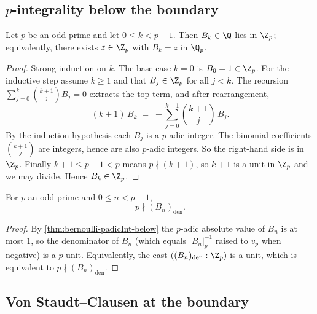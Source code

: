 \subsection*{$p$-integrality below the boundary}

\begin{theorem}
  \label{thm:bernoulli-padicInt-below}
  \leanok
Let $p$ be an odd prime and let $0 \le k < p - 1$. Then
$B_k \in \Q$ lies in $\Z_p$; equivalently, there exists $z \in \Z_p$
with $B_k = z$ in $\Q_p$.
\end{theorem}

\begin{proof}\leanok
Strong induction on $k$. The base case $k = 0$ is $B_0 = 1 \in \Z_p$.
For the inductive step assume $k \ge 1$ and that $B_j \in \Z_p$ for
all $j < k$. The recursion $\sum_{j=0}^{k} \binom{k+1}{j} B_j = 0$
extracts the top term, and after rearrangement,
\[
  (k + 1)\,B_k
  \;=\; -\sum_{j = 0}^{k - 1} \binom{k+1}{j}\,B_j.
\]
By the induction hypothesis each $B_j$ is a $p$-adic integer. The
binomial coefficients $\binom{k+1}{j}$ are integers, hence are also
$p$-adic integers. So the right-hand side is in $\Z_p$. Finally
$k + 1 \le p - 1 < p$ means $p \nmid (k+1)$, so $k + 1$ is a unit in
$\Z_p$ and we may divide. Hence $B_k \in \Z_p$.
\end{proof}

\begin{corollary}
  \label{cor:bernoulli-den-coprime}
  \leanok
For $p$ an odd prime and $0 \le n < p - 1$,
\[
  p \nmid (B_n)_{\text{den}}.
\]
\end{corollary}

\begin{proof}\leanok
By \cref{thm:bernoulli-padicInt-below} the $p$-adic absolute value of
$B_n$ is at most $1$, so the denominator of $B_n$ (which equals
$|B_n|_p^{-1}$ raised to $v_p$ when negative) is a $p$-unit. Equivalently,
the cast $((B_n)_{\text{den}} : \Z_p)$ is a unit, which is equivalent
to $p \nmid (B_n)_{\text{den}}$.
\end{proof}

\subsection*{Von Staudt--Clausen at the boundary}

